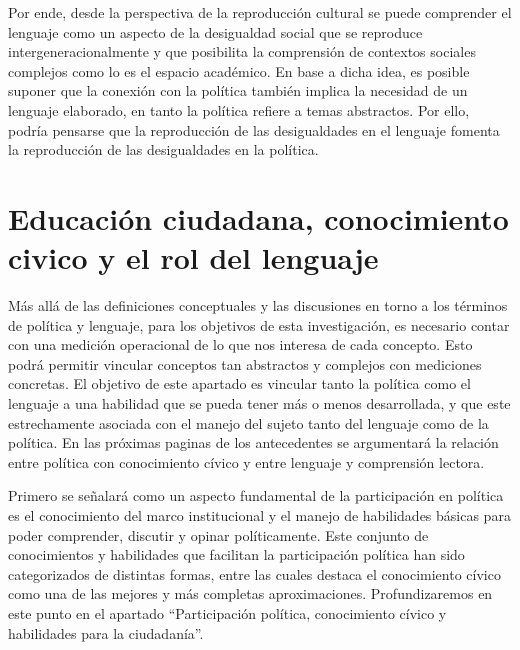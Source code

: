 \documentclass[12pt,twoside]{templates/facsothesis}
\begin{document}
Por ende, desde la perspectiva de la reproducción cultural se puede comprender el lenguaje como un aspecto de la desigualdad social que se reproduce intergeneracionalmente y que posibilita la comprensión de contextos sociales complejos como lo es el espacio académico. En base a dicha idea, es posible suponer que la conexión con la política también implica la necesidad de un lenguaje elaborado, en tanto la política refiere a temas abstractos. Por ello, podría pensarse que la reproducción de las desigualdades en el lenguaje fomenta la reproducción de las desigualdades en la política.

\hypertarget{educaciuxf3n-ciudadana-conocimiento-civico-y-el-rol-del-lenguaje}{%
\section{Educación ciudadana, conocimiento civico y el rol del lenguaje}\label{educaciuxf3n-ciudadana-conocimiento-civico-y-el-rol-del-lenguaje}}

Más allá de las definiciones conceptuales y las discusiones en torno a los términos de política y lenguaje, para los objetivos de esta investigación, es necesario contar con una medición operacional de lo que nos interesa de cada concepto. Esto podrá permitir vincular conceptos tan abstractos y complejos con mediciones concretas.
El objetivo de este apartado es vincular tanto la política como el lenguaje a una habilidad que se pueda tener más o menos desarrollada, y que este estrechamente asociada con el manejo del sujeto tanto del lenguaje como de la política. En las próximas paginas de los antecedentes se argumentará la relación entre política con conocimiento cívico y entre lenguaje y comprensión lectora.

Primero se señalará como un aspecto fundamental de la participación en política es el conocimiento del marco institucional y el manejo de habilidades básicas para poder comprender, discutir y opinar políticamente. Este conjunto de conocimientos y habilidades que facilitan la participación política han sido categorizados de distintas formas, entre las cuales destaca el conocimiento cívico como una de las mejores y más completas aproximaciones. Profundizaremos en este punto en el apartado ``Participación política, conocimiento cívico y habilidades para la ciudadanía''.
\end{document}
